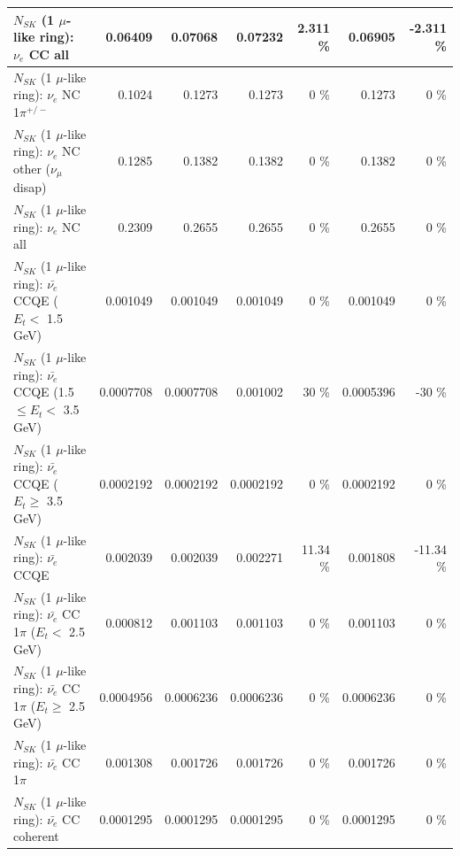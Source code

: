 \begin{table}
\begin{tabular}{| l | r | r | r  r | r  r |}
                                  $N_{SK}$ (1 $\mu$-like ring): $\nu_{e}$ CC all &         0.06409 &         0.07068 &         0.07232 &    2.311 \%  &         0.06905 &   -2.311 \%  \\ 
\hline
                           $N_{SK}$ (1 $\mu$-like ring): $\nu_e$ NC 1$\pi^{+/-}$ &          0.1024 &          0.1273 &          0.1273 &        0 \%  &          0.1273 &        0 \%  \\ 
                $N_{SK}$ (1 $\mu$-like ring): $\nu_e$ NC other ($\nu_\mu$ disap) &          0.1285 &          0.1382 &          0.1382 &        0 \%  &          0.1382 &        0 \%  \\ 
                                  $N_{SK}$ (1 $\mu$-like ring): $\nu_{e}$ NC all &          0.2309 &          0.2655 &          0.2655 &        0 \%  &          0.2655 &        0 \%  \\ 
\hline
\hline
\hline
            $N_{SK}$ (1 $\mu$-like ring): $\bar{\nu_e}$ CCQE ($E_{t} <$ 1.5 GeV) &        0.001049 &        0.001049 &        0.001049 &        0 \%  &        0.001049 &        0 \%  \\ 
   $N_{SK}$ (1 $\mu$-like ring): $\bar{\nu_e}$ CCQE (1.5 $\leq E_{t} <$ 3.5 GeV) &       0.0007708 &       0.0007708 &        0.001002 &       30 \%  &       0.0005396 &      -30 \%  \\ 
         $N_{SK}$ (1 $\mu$-like ring): $\bar{\nu_e}$ CCQE ($E_{t} \geq$ 3.5 GeV) &       0.0002192 &       0.0002192 &       0.0002192 &        0 \%  &       0.0002192 &        0 \%  \\ 
\hline
                                $N_{SK}$ (1 $\mu$-like ring): $\bar{\nu_e}$ CCQE &        0.002039 &        0.002039 &        0.002271 &    11.34 \%  &        0.001808 &   -11.34 \%  \\ 
\hline
       $N_{SK}$ (1 $\mu$-like ring): $\bar{\nu_e}$ CC 1$\pi$ ($E_{t} <$ 2.5 GeV) &        0.000812 &        0.001103 &        0.001103 &        0 \%  &        0.001103 &        0 \%  \\ 
    $N_{SK}$ (1 $\mu$-like ring): $\bar{\nu_e}$ CC 1$\pi$ ($E_{t} \geq$ 2.5 GeV) &       0.0004956 &       0.0006236 &       0.0006236 &        0 \%  &       0.0006236 &        0 \%  \\ 
\hline
                           $N_{SK}$ (1 $\mu$-like ring): $\bar{\nu_e}$ CC 1$\pi$ &        0.001308 &        0.001726 &        0.001726 &        0 \%  &        0.001726 &        0 \%  \\ 
                         $N_{SK}$ (1 $\mu$-like ring): $\bar{\nu_e}$ CC coherent &       0.0001295 &       0.0001295 &       0.0001295 &        0 \%  &       0.0001295 &        0 \%  \\ 

\end{tabular}
\end{table}
